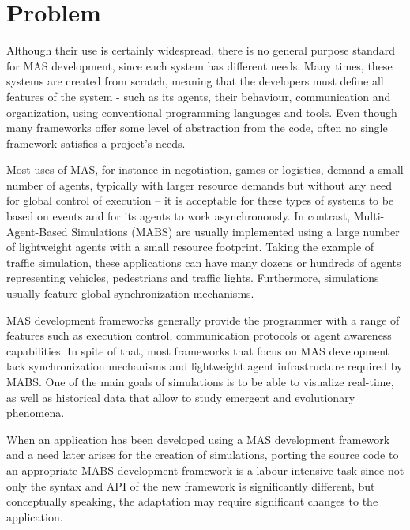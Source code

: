 \section{Problem}

Although their use is certainly widespread, there is no general purpose standard for MAS development, since each system has different needs. Many times, these systems are created from scratch, meaning that the developers must define all features of the system - such as its agents, their behaviour, communication and organization, using conventional programming languages and tools. Even though many frameworks offer some level of abstraction from the code, often no single framework satisfies a project's needs.

Most uses of MAS, for instance in negotiation, games or logistics, demand a small number of agents, typically with larger resource demands but without any need for global control of execution -- it is acceptable for these types of systems to be based on events and for its agents to work asynchronously. In contrast, Multi-Agent-Based Simulations (MABS) are usually implemented using a large number of lightweight agents with a small resource footprint. Taking the example of traffic simulation, these applications can have many dozens or hundreds of agents representing vehicles, pedestrians and traffic lights. Furthermore, simulations usually feature global synchronization mechanisms.

MAS development frameworks generally provide the programmer with a range of features such as execution control, communication protocols or agent awareness capabilities. In spite of that, most frameworks that focus on MAS development lack synchronization mechanisms and lightweight agent infrastructure required by MABS. One of the main goals of simulations is to be able to visualize real-time, as well as historical data that allow to study emergent and evolutionary phenomena. \cite{mengistu2008scalability}

When an application has been developed using a MAS development framework and a need later arises for the creation of simulations, porting the source code to an appropriate MABS development framework is a labour-intensive task since not only the syntax and API of the new framework is significantly different, but conceptually speaking, the adaptation may require significant changes to the application.


